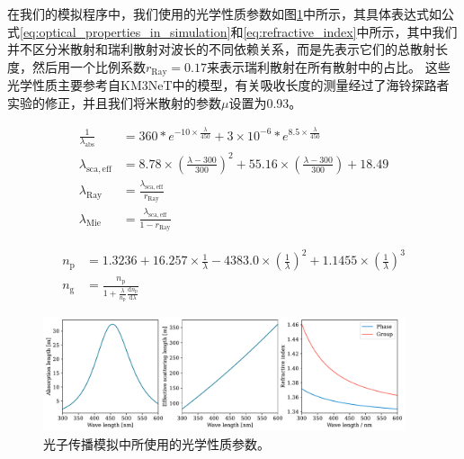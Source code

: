 在我们的模拟程序中，我们使用的光学性质参数如图\ref{fig:optical_properties_in_simulation}中所示，其具体表达式如公式\ref{eq:optical_properties_in_simulation}和\ref{eq:refractive_index}中所示，其中我们并不区分米散射和瑞利散射对波长的不同依赖关系，而是先表示它们的总散射长度，然后用一个比例系数$r_\mathrm{Ray}=0.17$来表示瑞利散射在所有散射中的占比。
这些光学性质主要参考自KM3NeT中的模型\cite{Kopper:2010, Herold:2017}，有关吸收长度的测量经过了海铃探路者实验的修正\cite{TRIDENT_pathfinder:2022}，并且我们将米散射的参数$\mu$设置为0.93\cite{OP_Grace:2018}。

\begin{equation}
\begin{aligned}
    \frac{1}{\lambda_\mathrm{abs}} &= 
    360 * e^{-10 \times \frac{\lambda}{450}} + 
    3\times10^{-6} * e^{8.5 \times \frac{\lambda}{450}} \\
    \lambda_\mathrm{sca,eff} &= 
    8.78 \times \left(\frac{\lambda-300}{300} \right)^2 + 
    55.16 \times \left(\frac{\lambda-300}{300} \right) +
    18.49 \\
    \lambda_\mathrm{Ray} &= 
    \frac{\lambda_\mathrm{sca,eff}}{r_\mathrm{Ray}} \\
    \lambda_\mathrm{Mie} &= 
    \frac{\lambda_\mathrm{sca,eff}}{1 - r_\mathrm{Ray}}
    \label{eq:optical_properties_in_simulation}
\end{aligned}
\end{equation}

\begin{equation}
\begin{aligned}
    n_\mathrm{p} &=
    1.3236 + 16.257 \times \frac{1}{\lambda} - 
    4383.0 \times \left( \frac{1}{\lambda} \right)^2 + 
    1.1455 \times \left( \frac{1}{\lambda} \right)^3 \\
    n_\mathrm{g} &= 
    \frac{n_\mathrm{p}}{1 + \frac{\lambda}{n_\mathrm{p}} \frac{\mathrm{d} n_\mathrm{p}}{\mathrm{d} \lambda}}
    \label{eq:refractive_index}
\end{aligned}
\end{equation}


\begin{figure}[htb]
\centering
    \includegraphics[width=0.95\textwidth]{img/optical_properties_in_simulation.pdf}
    \caption{光子传播模拟中所使用的光学性质参数。}
    \label{fig:optical_properties_in_simulation}
\end{figure}

